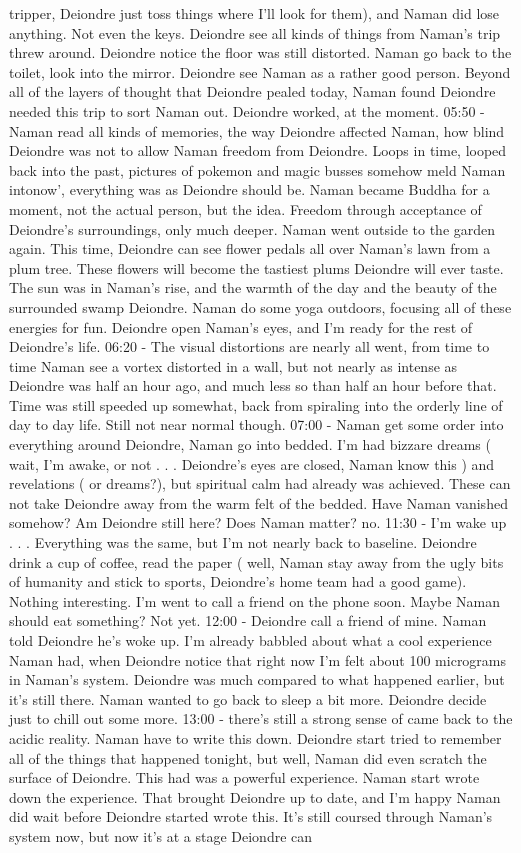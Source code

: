 \documentclass[12pt]{book}
\begin{document}
tripper, Deiondre just toss things where I'll look for them), and Naman did lose anything. Not even the keys. Deiondre see all kinds of things from Naman's trip threw around. Deiondre notice the floor was still distorted. Naman go back to the toilet, look into the mirror. Deiondre see Naman as a rather good person. Beyond all of the layers of thought that Deiondre pealed today, Naman found Deiondre needed this trip to sort Naman out. Deiondre worked, at the moment. 05:50 - Naman read all kinds of memories, the way Deiondre affected Naman, how blind Deiondre was not to allow Naman freedom from Deiondre. Loops in time, looped back into the past, pictures of pokemon and magic busses somehow meld Naman intonow', everything was as Deiondre should be. Naman became Buddha for a moment, not the actual person, but the idea. Freedom through acceptance of Deiondre's surroundings, only much deeper. Naman went outside to the garden again. This time, Deiondre can see flower pedals all over Naman's lawn from a plum tree. These flowers will become the tastiest plums Deiondre will ever taste. The sun was in Naman's rise, and the warmth of the day and the beauty of the surrounded swamp Deiondre. Naman do some yoga outdoors, focusing all of these energies for fun. Deiondre open Naman's eyes, and I'm ready for the rest of Deiondre's life. 06:20 - The visual distortions are nearly all went, from time to time Naman see a vortex distorted in a wall, but not nearly as intense as Deiondre was half an hour ago, and much less so than half an hour before that. Time was still speeded up somewhat, back from spiraling into the orderly line of day to day life. Still not near normal though. 07:00 - Naman get some order into everything around Deiondre, Naman go into bedded. I'm had bizzare dreams ( wait, I'm awake, or not . . .  Deiondre's eyes are closed, Naman know this ) and revelations ( or dreams?), but spiritual calm had already was achieved. These can not take Deiondre away from the warm felt of the bedded. Have Naman vanished somehow? Am Deiondre still here? Does Naman matter? no. 11:30 - I'm wake up . . .  Everything was the same, but I'm not nearly back to baseline. Deiondre drink a cup of coffee, read the paper ( well, Naman stay away from the ugly bits of humanity and stick to sports, Deiondre's home team had a good game). Nothing interesting. I'm went to call a friend on the phone soon. Maybe Naman should eat something? Not yet. 12:00 - Deiondre call a friend of mine. Naman told Deiondre he's woke up. I'm already babbled about what a cool experience Naman had, when Deiondre notice that right now I'm felt about 100 micrograms in Naman's system. Deiondre was much compared to what happened earlier, but it's still there. Naman wanted to go back to sleep a bit more. Deiondre decide just to chill out some more. 13:00 - there's still a strong sense of came back to the acidic reality. Naman have to write this down. Deiondre start tried to remember all of the things that happened tonight, but well, Naman did even scratch the surface of Deiondre. This had was a powerful experience. Naman start wrote down the experience. That brought Deiondre up to date, and I'm happy Naman did wait before Deiondre started wrote this. It's still coursed through Naman's system now, but now it's at a stage Deiondre can 
\end{document}
